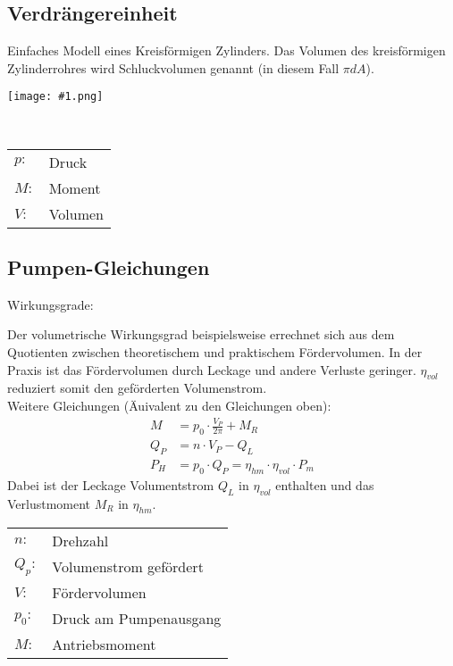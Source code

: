 \documentclass[landscape,a4paper,10pt]{article}
\newcommand{\graphicsm}[1]{
\noindent
\begin{minipage}{\columnwidth}
\centering
\texttt{[image: \#1.png]}
\end{minipage} 
\medskip 
\\
}
\begin{document}
\begin{multicols*}{3}
\subsection{Verdrängereinheit}
Einfaches Modell eines Kreisförmigen Zylinders. Das Volumen des kreisförmigen Zylinderrohres wird Schluckvolumen genannt (in diesem Fall $\pi  d  A$). 
\graphicsm{verdraengereinheit}
\begin{tabular}{ll}
$p:$ & Druck \\
$M:$ & Moment \\
$V:$ & Volumen
\end{tabular}


\vfill
\columnbreak
\subsection{Pumpen-Gleichungen}
Wirkungsgrade:

Der volumetrische Wirkungsgrad beispielsweise errechnet sich aus dem Quotienten zwischen theoretischem und praktischem Fördervolumen. In der Praxis ist das Fördervolumen durch Leckage und andere Verluste geringer. $\eta_{vol}$ reduziert somit den geförderten Volumenstrom. \\

Weitere Gleichungen (Äuivalent zu den Gleichungen oben):
\begin{align*}
M &= p_0 \cdot \frac{V_P}{2 \pi} + M_R \tag{Pumpenmoment} \\
Q_P &= n \cdot V_P - Q_L \tag{Volumenstrom} \\
P_H &= p_0 \cdot Q_P = \eta_{hm} \cdot \eta_{vol} \cdot P_m \tag{Leistung}
\end{align*}
Dabei ist der Leckage Volumentstrom $Q_L$ in $\eta_{vol}$ enthalten und das Verlustmoment $M_R$ in $\eta_{hm}$.

\begin{tabular}{ll}
$n:$ & Drehzahl \\
$Q_p:$ & Volumenstrom gefördert\\
$V:$ & Fördervolumen \\
$p_0:$ & Druck am Pumpenausgang \\
$M:$ & Antriebsmoment
\end{tabular}


\end{multicols*}
\end{document}
